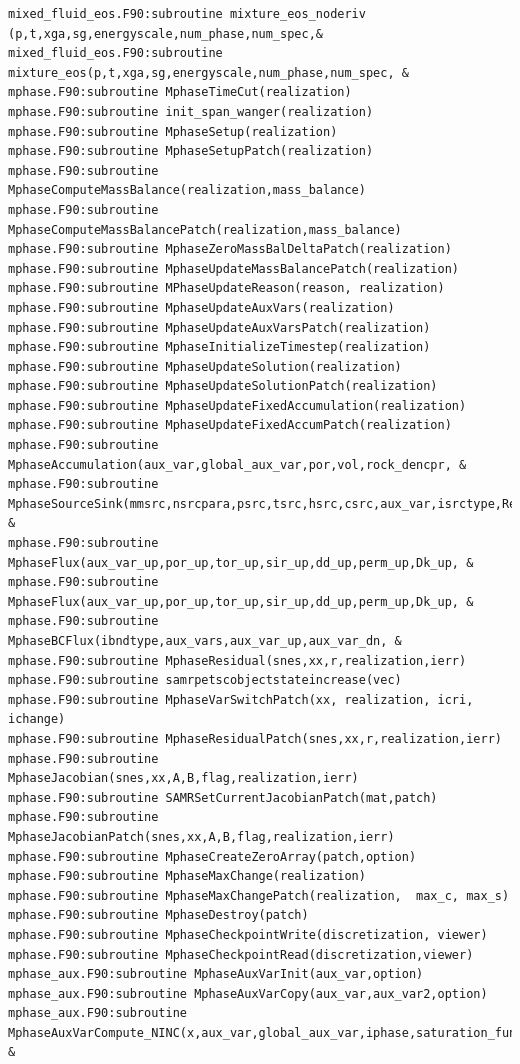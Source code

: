 \documentclass[12pt]{article}
\begin{document}
\begin{verbatim}
mixed_fluid_eos.F90:subroutine mixture_eos_noderiv (p,t,xga,sg,energyscale,num_phase,num_spec,&
mixed_fluid_eos.F90:subroutine mixture_eos(p,t,xga,sg,energyscale,num_phase,num_spec, &
mphase.F90:subroutine MphaseTimeCut(realization)
mphase.F90:subroutine init_span_wanger(realization)
mphase.F90:subroutine MphaseSetup(realization)
mphase.F90:subroutine MphaseSetupPatch(realization)
mphase.F90:subroutine MphaseComputeMassBalance(realization,mass_balance)
mphase.F90:subroutine MphaseComputeMassBalancePatch(realization,mass_balance)
mphase.F90:subroutine MphaseZeroMassBalDeltaPatch(realization)
mphase.F90:subroutine MphaseUpdateMassBalancePatch(realization)
mphase.F90:subroutine MPhaseUpdateReason(reason, realization)
mphase.F90:subroutine MphaseUpdateAuxVars(realization)
mphase.F90:subroutine MphaseUpdateAuxVarsPatch(realization)
mphase.F90:subroutine MphaseInitializeTimestep(realization)
mphase.F90:subroutine MphaseUpdateSolution(realization)
mphase.F90:subroutine MphaseUpdateSolutionPatch(realization)
mphase.F90:subroutine MphaseUpdateFixedAccumulation(realization)
mphase.F90:subroutine MphaseUpdateFixedAccumPatch(realization)
mphase.F90:subroutine MphaseAccumulation(aux_var,global_aux_var,por,vol,rock_dencpr, &
mphase.F90:subroutine MphaseSourceSink(mmsrc,nsrcpara,psrc,tsrc,hsrc,csrc,aux_var,isrctype,Res, &
mphase.F90:subroutine MphaseFlux(aux_var_up,por_up,tor_up,sir_up,dd_up,perm_up,Dk_up, &
mphase.F90:subroutine MphaseFlux(aux_var_up,por_up,tor_up,sir_up,dd_up,perm_up,Dk_up, &
mphase.F90:subroutine MphaseBCFlux(ibndtype,aux_vars,aux_var_up,aux_var_dn, &
mphase.F90:subroutine MphaseResidual(snes,xx,r,realization,ierr)
mphase.F90:subroutine samrpetscobjectstateincrease(vec)
mphase.F90:subroutine MphaseVarSwitchPatch(xx, realization, icri, ichange)
mphase.F90:subroutine MphaseResidualPatch(snes,xx,r,realization,ierr)
mphase.F90:subroutine MphaseJacobian(snes,xx,A,B,flag,realization,ierr)
mphase.F90:subroutine SAMRSetCurrentJacobianPatch(mat,patch) 
mphase.F90:subroutine MphaseJacobianPatch(snes,xx,A,B,flag,realization,ierr)
mphase.F90:subroutine MphaseCreateZeroArray(patch,option)
mphase.F90:subroutine MphaseMaxChange(realization)
mphase.F90:subroutine MphaseMaxChangePatch(realization,  max_c, max_s)
mphase.F90:subroutine MphaseDestroy(patch)
mphase.F90:subroutine MphaseCheckpointWrite(discretization, viewer)
mphase.F90:subroutine MphaseCheckpointRead(discretization,viewer)
mphase_aux.F90:subroutine MphaseAuxVarInit(aux_var,option)
mphase_aux.F90:subroutine MphaseAuxVarCopy(aux_var,aux_var2,option)
mphase_aux.F90:subroutine MphaseAuxVarCompute_NINC(x,aux_var,global_aux_var,iphase,saturation_function, &

\end{verbatim}
\end{document}
